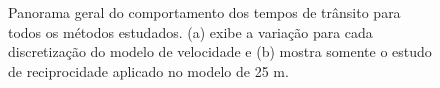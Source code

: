 \begin{figure}[H]
	\centering
	\newline
	\caption{Panorama geral do comportamento dos tempos de trânsito para todos os métodos estudados. (a) exibe a variação para cada discretização do modelo de velocidade e (b) mostra somente o estudo de reciprocidade aplicado no modelo de 25 m.}
	\label{fig:general_refraction_study}	
\end{figure}

